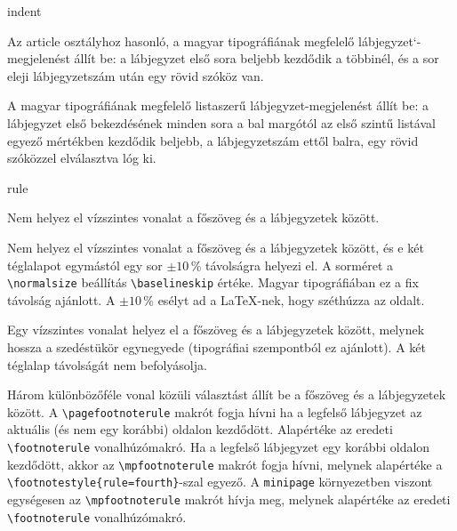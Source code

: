 \documentclass[12pt]{article}
\begin{document}
\begin{description}
\begin{footstyle}{indent}
\item[article-sp]
Az \textsf{article} osztályhoz hasonló, a magyar tipográfiának megfelelő lábjegyzet`-megjelenést állít be:
a lábjegyzet első sora beljebb kezdődik a többinél, és a sor eleji lábjegyzetszám után egy rövid szóköz van.

\item[hulist]
A magyar tipográfiának megfelelő listaszerű lábjegyzet-megjelenést állít be:
a lábjegyzet első bekezdésének minden sora a bal margótól az első szintű listával egyező mértékben kezdődik beljebb, a lábjegyzetszám ettől balra, egy rövid szóközzel elválasztva lóg ki.

\end{footstyle}

\begin{footstyle}{rule}

\item[none]
Nem helyez el vízszintes vonalat a főszöveg és a lábjegyzetek között.

\item[one-line]
Nem helyez el vízszintes vonalat a főszöveg és a lábjegyzetek között, és e két téglalapot egymástól egy sor $\pm10$\,\% távolságra helyezi el.
A sorméret a \verb|\normalsize| beállítás \verb|\baselineskip| értéke.
Magyar tipográfiában ez a fix távolság ajánlott.
A $\pm10$\,\% esélyt ad a \LaTeX-nek, hogy széthúzza az oldalt.

\item[fourth]
Egy vízszintes vonalat helyez el a főszöveg és a lábjegyzetek között, melynek hossza a szedéstükör egynegyede (tipográfiai szempontból ez ajánlott).
A két téglalap távolságát nem befolyásolja.

\item[choose]
Három különbözőféle vonal közüli választást állít be a főszöveg és a lábjegyzetek között.
A \verb|\pagefootnoterule| makrót fogja hívni ha a legfelső lábjegyzet az aktuális (és nem egy korábbi) oldalon kezdődött.
Alapértéke az eredeti \verb|\footnoterule| vonalhúzómakró.
Ha a legfelső lábjegyzet egy korábbi oldalon kezdődött, akkor az \verb|\mpfootnoterule| makrót fogja hívni, melynek alapértéke a \verb|\footnotestyle{rule=fourth}|-szal egyező.
A \texttt{minipage} környezetben viszont egységesen az \verb|\mpfootnoterule| makrót hívja meg, melynek alapértéke az eredeti \verb|\footnoterule| vonalhúzómakró.


\end{footstyle}
\end{description}
\end{document}
